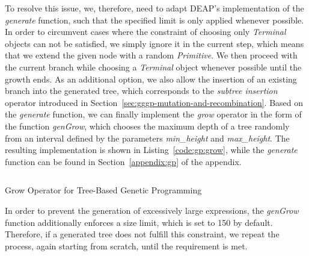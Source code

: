 To resolve this issue, we, therefore, need to adapt DEAP's implementation of the \emph{generate} function, such that the specified limit is only applied whenever possible.
In order to circumvent cases where the constraint of choosing only \emph{Terminal} objects can not be satisfied, we simply ignore it in the current step, which means that we extend the given node with a random \emph{Primitive}.
We then proceed with the current branch while choosing a \emph{Terminal} object whenever possible until the growth ends.
As an additional option, we also allow the insertion of an existing branch into the generated tree, which corresponds to the \emph{subtree insertion} operator introduced in Section~\ref{sec:gggp-mutation-and-recombination}.
Based on the \emph{generate} function, we can finally implement the \emph{grow} operator in the form of the function \emph{genGrow}, which chooses the maximum depth of a tree randomly from an interval defined by the parameters \emph{min\_height} and \emph{max\_height}.
The resulting implementation is shown in Listing~\ref{code:gp:grow}, while the \emph{generate} function can be found in Section~\ref{appendix:gp} of the appendix.
\begin{listing}
	\inputminted{python}{evostencils/gp/grow.py}
	\caption{Grow Operator for Tree-Based Genetic Programming}
	\label{code:gp:grow}
\end{listing}
In order to prevent the generation of excessively large expressions, the \emph{genGrow} function additionally enforces a size limit, which is set to 150 by default.
Therefore, if a generated tree does not fulfill this constraint, we repeat the process, again starting from scratch, until the requirement is met.

